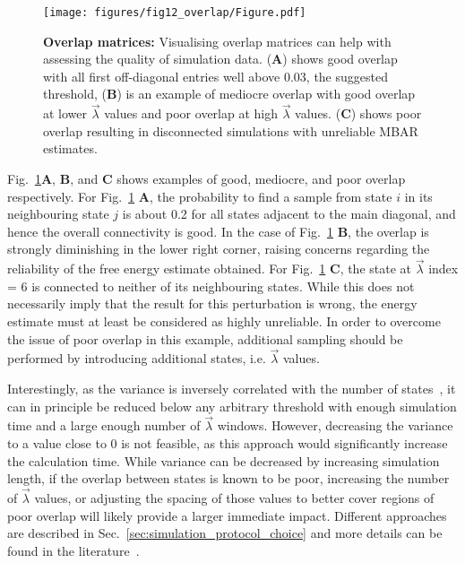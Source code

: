 \documentclass[9pt,bestpractices]{livecoms}
\begin{document}
\begin{figure}
\texttt{[image: figures/fig12\_overlap/Figure.pdf]}
\caption{\label{fig:overlap} \textbf{Overlap matrices:} Visualising overlap matrices can help with assessing the quality of simulation data. (\textbf{A}) shows good overlap with all first off-diagonal entries well above 0.03, the suggested threshold, (\textbf{B}) is an example of mediocre overlap with good overlap at lower $\vec{\lambda}$ values and poor overlap at high $\vec{\lambda}$ values. (\textbf{C}) shows poor overlap resulting in disconnected simulations with unreliable MBAR estimates.}
\end{figure}

Fig.~\ref{fig:overlap}\textbf{A}, \textbf{B}, and \textbf{C} shows examples of good, mediocre, and poor overlap respectively. For Fig.~\ref{fig:overlap} \textbf{A}, the probability to find a sample from state $i$ in its neighbouring state $j$ is about 0.2 for all states adjacent to the main diagonal, and hence the overall connectivity is good. In the case of Fig.~\ref{fig:overlap} \textbf{B}, the overlap is strongly diminishing in the lower right corner, raising concerns regarding the reliability of the free energy estimate obtained. For Fig.~\ref{fig:overlap} \textbf{C}, the state at $\vec{\lambda}$ index = 6 is connected to neither of its neighbouring states. While this does not necessarily imply that the result for this perturbation is wrong, the energy estimate must at least be considered as highly unreliable.
In order to overcome the issue of poor overlap in this example, additional sampling should be performed by introducing additional states, i.e. $\vec{\lambda}$ values.

Interestingly, as the variance is inversely correlated with the number of states~\cite{klimovich2015guidelines}, it can in principle be reduced below any arbitrary threshold with enough simulation time and a large enough number of $\vec{\lambda}$ windows. However, decreasing the variance to a value close to 0 is not feasible, as this approach would significantly increase the calculation time. While variance can be decreased by increasing simulation length, if the overlap between states is known to be poor, increasing the number of $\vec{\lambda}$ values, or adjusting the spacing of those values to better cover regions of poor overlap will likely provide a larger immediate impact. Different approaches are described in Sec.~\ref{sec:simulation_protocol_choice} and more details can be found in the literature~\cite{dakka2018concurrent, hahn2019alchemical}.
\end{document}
